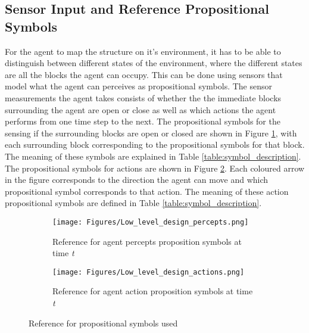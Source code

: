 
\subsection{Sensor Input and Reference Propositional Symbols}
\label{subsec: sensor_prop_symbols}

For the agent to map the structure on it's environment, it has to be able to distinguish between different states of the environment, where the different states are all the blocks the agent can occupy. This can be done using sensors that model what the agent can perceives as propositional symbols. The sensor measurements the agent takes consists of whether the the immediate blocks surrounding the agent are open or close as well as which actions the agent performs from one time step to the next. The propositional symbols for the sensing if the surrounding blocks are open or closed are shown in Figure \ref{subfig:sensor_percepts}, with each surrounding block corresponding to the propositional symbols for that block. The meaning of these symbols are explained in Table \ref{table:symbol_description}. The propositional symbols for actions are shown in  Figure \ref{subfig:sensor_actions}. Each coloured arrow in the figure corresponds to the direction the agent can move and which propositional symbol corresponds to that action. The meaning of these action propositional symbols are defined in Table \ref{table:symbol_description}.

\begin{figure}[H]
\captionsetup[subfigure]{justification=centering}
\centering
\begin{subfigure}{.5\textwidth}
    \centering
    \texttt{[image: Figures/Low\_level\_design\_percepts.png]}
    \caption{Reference for agent percepts proposition symbols at time \textit{t}} 
    \label{subfig:sensor_percepts}
\end{subfigure}%
\begin{subfigure}{.5\textwidth}
    \centering
    \texttt{[image: Figures/Low\_level\_design\_actions.png]}
    \caption{Reference for agent action proposition symbols at time \textit{t}} 
    \label{subfig:sensor_actions}
\end{subfigure}
\caption{Reference for propositional symbols used}
\label{fig:test}
\end{figure}



